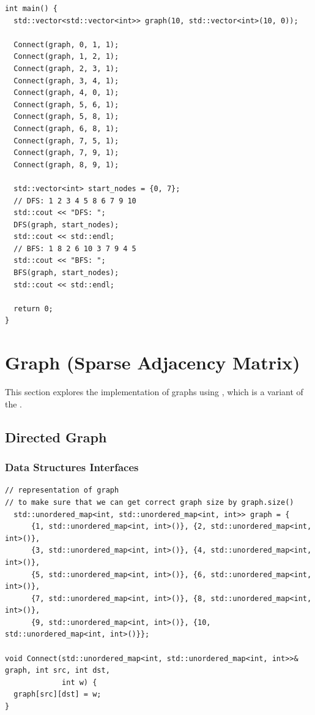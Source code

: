 \begin{lstlisting}
int main() {
  std::vector<std::vector<int>> graph(10, std::vector<int>(10, 0));

  Connect(graph, 0, 1, 1);
  Connect(graph, 1, 2, 1);
  Connect(graph, 2, 3, 1);
  Connect(graph, 3, 4, 1);
  Connect(graph, 4, 0, 1);
  Connect(graph, 5, 6, 1);
  Connect(graph, 5, 8, 1);
  Connect(graph, 6, 8, 1);
  Connect(graph, 7, 5, 1);
  Connect(graph, 7, 9, 1);
  Connect(graph, 8, 9, 1);

  std::vector<int> start_nodes = {0, 7};
  // DFS: 1 2 3 4 5 8 6 7 9 10
  std::cout << "DFS: ";
  DFS(graph, start_nodes);
  std::cout << std::endl;
  // BFS: 1 8 2 6 10 3 7 9 4 5
  std::cout << "BFS: ";
  BFS(graph, start_nodes);
  std::cout << std::endl;

  return 0;
}
\end{lstlisting}

\section{Graph (Sparse Adjacency Matrix)}
This section explores the implementation of graphs using {\color{blue}{sparse adjacency matrix}}, which is a variant of the {\color{blue}{adjacency matrix}}.

\subsection{Directed Graph}
\subsubsection{Data Structures Interfaces}
\begin{lstlisting}
// representation of graph
// to make sure that we can get correct graph size by graph.size()
  std::unordered_map<int, std::unordered_map<int, int>> graph = {
      {1, std::unordered_map<int, int>()}, {2, std::unordered_map<int, int>()},
      {3, std::unordered_map<int, int>()}, {4, std::unordered_map<int, int>()},
      {5, std::unordered_map<int, int>()}, {6, std::unordered_map<int, int>()},
      {7, std::unordered_map<int, int>()}, {8, std::unordered_map<int, int>()},
      {9, std::unordered_map<int, int>()}, {10, std::unordered_map<int, int>()}};

void Connect(std::unordered_map<int, std::unordered_map<int, int>>& graph, int src, int dst,
             int w) {
  graph[src][dst] = w;
}
\end{lstlisting}
